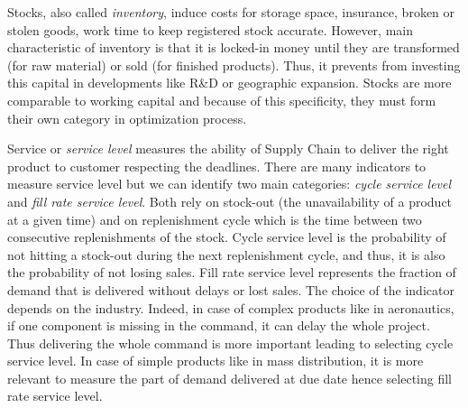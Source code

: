 Stocks, also called \emph{inventory}, induce costs for storage space, insurance, broken or stolen goods, work time to keep registered stock accurate.
However, main characteristic of inventory is that it is locked-in money until they are transformed (for raw material) or sold (for finished products).
Thus, it prevents from investing this capital in developments like R\&D or geographic expansion.
Stocks are more comparable to working capital and because of this specificity, they must form their own category in optimization process.




Service or \emph{service level} measures the ability of Supply Chain to deliver the right product to customer respecting the deadlines.
There are many indicators to measure service level but we can identify two main categories: \emph{cycle service level} and \emph{fill rate service level}.
Both rely on stock-out (\ie the unavailability of a product at a given time) and on replenishment cycle which is the time between two consecutive replenishments of the stock.
Cycle service level is the probability of not hitting a stock-out during the next replenishment cycle, and thus, it is also the probability of not losing sales.
Fill rate service level represents the fraction of demand that is delivered without delays or lost sales.
The choice of the indicator depends on the industry.
Indeed, in case of complex products like in aeronautics, if one component is missing in the command, it can delay the whole project.
Thus delivering the whole command is more important leading to selecting cycle service level.
In case of simple products like in mass distribution, it is more relevant to measure the part of demand delivered at due date hence selecting fill rate service level.


